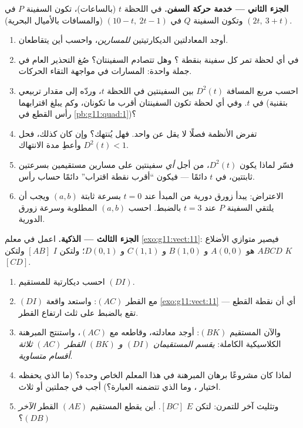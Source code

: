 \begin{problem}
\medskip
\noindent\textbf{الجزء الثاني --- خدمة حركة السفن.}
في اللحظة $t$ (بالساعات)، تكون السفينة $P$ في $(2t,\ 3 + t)$ وتكون السفينة $Q$
في $(10 - t,\ 2t - 1)$ (والمسافات بالأميال البحرية).
\begin{enumerate}[resume]
  \item أوجد المعادلتين الديكارتيتين \emph{للمسارين}،
        واحسب أين يتقاطعان.
  \item في أي لحظة تمر كل سفينة بنقطة ؟ وهل
        تتصادم السفينتان؟ صُغ التحذير العام في جملة واحدة:
         المسارات في مواجهة التقاء الحركات.
  \item احسب مربع المسافة $D^2(t)$ بين السفينتين
        في اللحظة $t$، وردّه إلى مقدار تربيعي في $t$. وفي
        أي لحظة تكون السفينتان أقرب ما تكونان، وكم يبلغ اقترابهما
        (بتقنية رأس القطع في \cref{pb:g11:quad:1})؟
  \item تفرض الأنظمة فصلًا لا يقل عن  واحد.
        فهل يُنتهك؟ وإن كان كذلك، فحل $D^2(t) < 1$ وأعطِ
        مدة الانتهاك.
  \item فسّر لماذا يكون $D^2(t)$، من أجل \emph{أي} سفينتين على
        مسارين مستقيمين بسرعتين ثابتتين،  في $t$ دائمًا ---
        فيكون ``أقرب نقطة اقتراب'' دائمًا
        حساب رأس.
  \item الاعتراض: يبدأ زورق دورية من المبدأ عند
        $t = 0$ بسرعة ثابتة $(a, b)$ ويجب أن يلتقي
        السفينة $P$ عند $t = 3$ بالضبط. احسب $(a, b)$ المطلوبة
        وسرعة زورق الدورية.
\end{enumerate}

\medskip
\noindent\textbf{الجزء الثالث ---  الذكية.}
اعمل في معلم \cref{exo:g11:vect:11}: فيصير متوازي الأضلاع
$ABCD$ هو $A(0,0)$ و $B(1,0)$ و $C(1,1)$ و $D(0,1)$؛ ولتكن $I$
 $[AB]$ ولتكن $K$  $[CD]$.
\begin{enumerate}[resume]
  \item احسب  ديكارتية للمستقيم $(DI)$.
  \item {} $(DI)$ مع القطر $(AC)$: واستعد
        واقعة \cref{exo:g11:vect:11} --- أي أن نقطة القطع تقع بالضبط
        على ثلث ارتفاع القطر.
  \item والآن المستقيم $(BK)$: أوجد معادلته، وقاطعه مع
        $(AC)$، واستنتج المبرهنة الكلاسيكية الكاملة:
        \emph{يقسم المستقيمان $(DI)$ و $(BK)$ القطر
        $(AC)$ ثلاثة أقسام متساوية}.
  \item لماذا كان مشروعًا برهان المبرهنة في هذا المعلم
        الخاص وحده؟ (ما الذي يحفظه اختيار ،
        وما الذي تتضمنه العبارة؟) أجب
        في جملتين أو ثلاث.
  \item وتثليث آخر للتمرن: لتكن $E$
         $[BC]$. أين يقطع المستقيم $(AE)$
        القطر \emph{الآخر} $(DB)$؟
\end{enumerate}


\end{problem}
